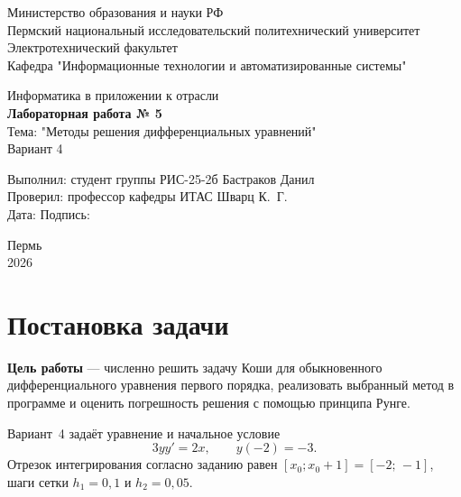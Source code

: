 \documentclass[14pt,a4paper]{extarticle}
\begin{document}
\begin{titlepage}
    \centering
    \large
    Министерство образования и науки РФ\\[0.3cm]
    Пермский национальный исследовательский политехнический университет\\[0.3cm]
    Электротехнический факультет\\[0.3cm]
    Кафедра "Информационные технологии и автоматизированные системы"

    \vspace{3.5cm}
    {\Large Информатика в приложении к отрасли}\\[0.4cm]
    {\Large\bfseries Лабораторная работа № 5}\\[0.6cm]

    Тема: "Методы решения дифференциальных уравнений"\\[0.2cm]
    Вариант 4

    \vspace{4.5cm}
    \begin{flushleft}
        \large
        Выполнил: студент группы РИС-25-2б \hfill Бастраков Данил\\[0.5cm]
        Проверил: профессор кафедры ИТАС \hfill Шварц К.~Г.\\[0.5cm]
        Дата: \underline{\hspace{3cm}} \hfill Подпись: \underline{\hspace{4cm}}
    \end{flushleft}

    \vfill
    Пермь\\ 2026
\end{titlepage}

\tableofcontents
\newpage

\section{Постановка задачи}

\textbf{Цель работы} --- численно решить задачу Коши для обыкновенного
дифференциального уравнения первого порядка, реализовать выбранный метод
в программе и оценить погрешность решения с помощью принципа Рунге.

Вариант~4 задаёт уравнение и начальное условие
\begin{equation}
    3y y' = 2x, \qquad y(-2) = -3 .
    \label{eq:cauchy}
\end{equation}
Отрезок интегрирования согласно заданию равен $[x_0; x_0+1] = [-2;\, -1]$,
шаги сетки $h_1=0{,}1$ и $h_2=0{,}05$.
\end{document}
